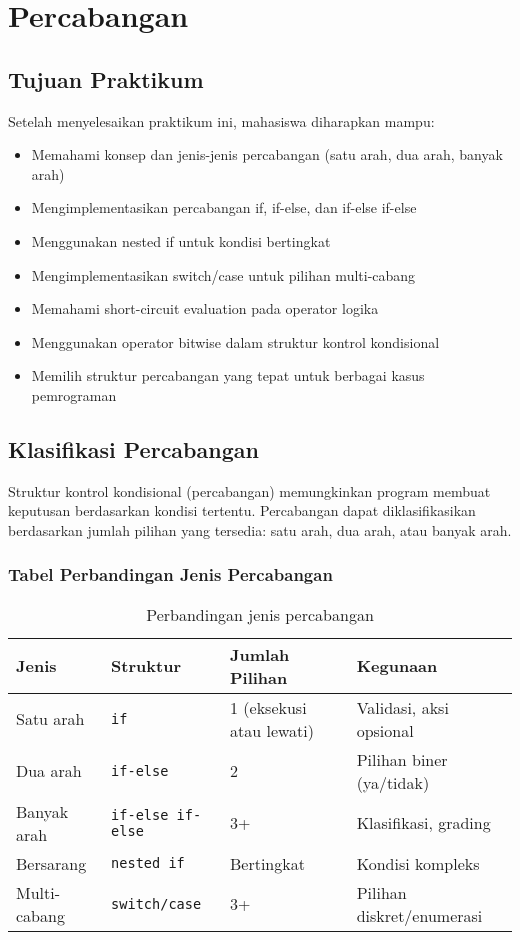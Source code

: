 \documentclass[../main.tex]{subfiles}
\begin{document}
\chapter{Percabangan}

\section*{Tujuan Praktikum}
Setelah menyelesaikan praktikum ini, mahasiswa diharapkan mampu:
\begin{itemize}
  \item Memahami konsep dan jenis-jenis percabangan (satu arah, dua arah, banyak arah)
  \item Mengimplementasikan percabangan if, if-else, dan if-else if-else
  \item Menggunakan nested if untuk kondisi bertingkat
  \item Mengimplementasikan switch/case untuk pilihan multi-cabang
  \item Memahami short-circuit evaluation pada operator logika
  \item Menggunakan operator bitwise dalam struktur kontrol kondisional
  \item Memilih struktur percabangan yang tepat untuk berbagai kasus pemrograman
\end{itemize}

\section{Klasifikasi Percabangan}
Struktur kontrol kondisional (percabangan) memungkinkan program membuat keputusan berdasarkan kondisi tertentu. Percabangan dapat diklasifikasikan berdasarkan jumlah pilihan yang tersedia: satu arah, dua arah, atau banyak arah.

\subsection{Tabel Perbandingan Jenis Percabangan}
\begin{table}[H]
  \centering
  \caption{Perbandingan jenis percabangan}
  \begin{tabular}{@{}llll@{}}
    \toprule
    Jenis & Struktur & Jumlah Pilihan & Kegunaan \\
    \midrule
    Satu arah & \texttt{if} & 1 (eksekusi atau lewati) & Validasi, aksi opsional \\
    Dua arah & \texttt{if-else} & 2 & Pilihan biner (ya/tidak) \\
    Banyak arah & \texttt{if-else if-else} & 3+ & Klasifikasi, grading \\
    Bersarang & \texttt{nested if} & Bertingkat & Kondisi kompleks \\
    Multi-cabang & \texttt{switch/case} & 3+ & Pilihan diskret/enumerasi \\
    \bottomrule
  \end{tabular}
\end{table}
\end{document}
